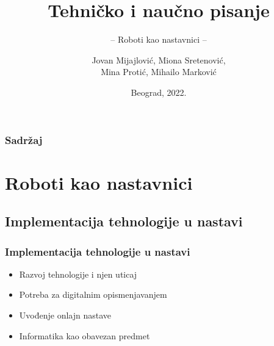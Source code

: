\documentclass[10pt]{beamer}
\title{Tehničko i naučno pisanje}
\subtitle{-- Roboti kao nastavnici --}
\author{Jovan Mijajlović, Miona Sretenović,\\ Mina Protić, Mihailo Marković}
\institute{Matematički fakultet\\Univerzitet u Beogradu}
\date{
	\footnotesize{Beograd, 2022.}	
}
\begin{document}
\begin{frame}
	\thispagestyle{empty}
	\titlepage
\end{frame}

\addtocounter{framenumber}{-1}

\begin{frame}[fragile]\frametitle{Sadržaj}
	\tableofcontents[]
\end{frame}

\section{Roboti kao nastavnici}

\subsection{Implementacija tehnologije u nastavi}

\begin{frame}[fragile]\frametitle{Implementacija tehnologije u nastavi}
	\begin{itemize}
	\item Razvoj tehnologije i njen uticaj
	\item Potreba za digitalnim opismenjavanjem
    \item Uvođenje onlajn nastave
    \item Informatika kao obavezan predmet
	\end{itemize}
\end{frame}
\end{document}
